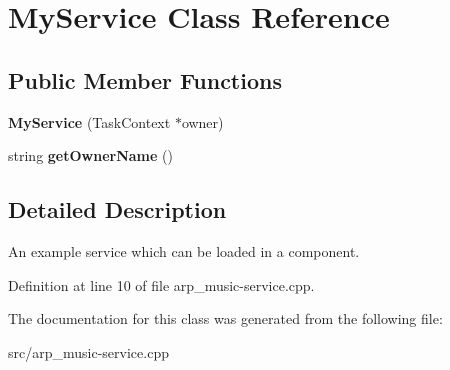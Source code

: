 \hypertarget{classMyService}{
\section{MyService Class Reference}
\label{classMyService}
}
\subsection*{Public Member Functions}
\begin{DoxyCompactItemize}
\item 
\hypertarget{classMyService_a8db2133b0b03855f3871b9c63da03c67}{
{\bfseries MyService} (TaskContext $\ast$owner)}
\label{classMyService_a8db2133b0b03855f3871b9c63da03c67}

\item 
\hypertarget{classMyService_aba1bfbd0c03b725b646ac48754a699fd}{
string {\bfseries getOwnerName} ()}
\label{classMyService_aba1bfbd0c03b725b646ac48754a699fd}

\end{DoxyCompactItemize}


\subsection{Detailed Description}
An example service which can be loaded in a component. 

Definition at line 10 of file arp\_\-music-\/service.cpp.



The documentation for this class was generated from the following file:\begin{DoxyCompactItemize}
\item 
src/arp\_\-music-\/service.cpp\end{DoxyCompactItemize}
